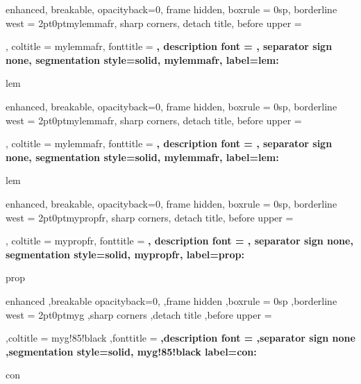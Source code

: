 {%
	enhanced,
	breakable,
	opacityback=0,
	frame hidden,
	boxrule = 0sp,
	borderline west = {2pt}{0pt}{mylemmafr},
	sharp corners,
	detach title,
	before upper = \tcbtitle\par\smallskip,
	coltitle = mylemmafr,
	fonttitle = \bfseries\sffamily,
	description font = \mdseries,
	separator sign none,
	segmentation style={solid, mylemmafr},
    label={lem:\thetcbcounter}
}
{lem}

{%
	enhanced,
	breakable,
	opacityback=0,
	frame hidden,
	boxrule = 0sp,
	borderline west = {2pt}{0pt}{mylemmafr},
	sharp corners,
	detach title,
	before upper = \tcbtitle\par\smallskip,
	coltitle = mylemmafr,
	fonttitle = \bfseries\sffamily,
	description font = \mdseries,
	separator sign none,
	segmentation style={solid, mylemmafr},
    label={lem:\thetcbcounter}
}
{lem}



{%
	enhanced,
	breakable,
	opacityback=0,
	frame hidden,
	boxrule = 0sp,
	borderline west = {2pt}{0pt}{mypropfr},
	sharp corners,
	detach title,
	before upper = \tcbtitle\par\smallskip,
	coltitle = mypropfr,
	fonttitle = \bfseries\sffamily,
	description font = \mdseries,
	separator sign none,
	segmentation style={solid, mypropfr},
    label={prop:\thetcbcounter}
}
{prop}

{%
	enhanced
	,breakable
	opacityback=0,
	,frame hidden
	,boxrule = 0sp
	,borderline west = {2pt}{0pt}{myg}
	,sharp corners
	,detach title
	,before upper = \tcbtitle\par\smallskip
	,coltitle = myg!85!black
	,fonttitle = \bfseries\sffamily
	,description font = \mdseries
	,separator sign none
	,segmentation style={solid, myg!85!black}
    label={con:\thetcbcounter}
}
{con}
\makeatother

